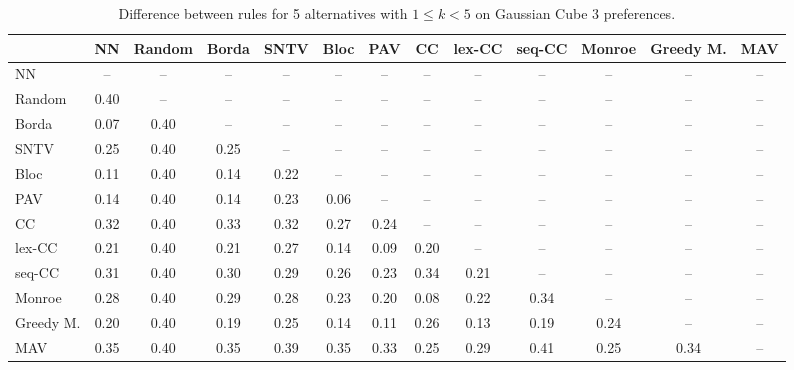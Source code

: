 
\begin{table*}[htbp]
\centering
\begin{tabular}{lcccccccccccc}
\toprule
 & NN & Random & Borda & SNTV & Bloc & PAV & CC & lex-CC & seq-CC & Monroe & Greedy M. & MAV \\
\midrule
NN & -- & -- & -- & -- & -- & -- & -- & -- & -- & -- & -- & -- \\
Random & \cellcolor{blue!40} 0.40 & -- & -- & -- & -- & -- & -- & -- & -- & -- & -- & -- \\
Borda & \cellcolor{blue!7} 0.07 & \cellcolor{blue!40} 0.40 & -- & -- & -- & -- & -- & -- & -- & -- & -- & -- \\
SNTV & \cellcolor{blue!25} 0.25 & \cellcolor{blue!40} 0.40 & \cellcolor{blue!25} 0.25 & -- & -- & -- & -- & -- & -- & -- & -- & -- \\
Bloc & \cellcolor{blue!11} 0.11 & \cellcolor{blue!40} 0.40 & \cellcolor{blue!14} 0.14 & \cellcolor{blue!22} 0.22 & -- & -- & -- & -- & -- & -- & -- & -- \\
PAV & \cellcolor{blue!14} 0.14 & \cellcolor{blue!40} 0.40 & \cellcolor{blue!14} 0.14 & \cellcolor{blue!23} 0.23 & \cellcolor{blue!6} 0.06 & -- & -- & -- & -- & -- & -- & -- \\
CC & \cellcolor{blue!32} 0.32 & \cellcolor{blue!40} 0.40 & \cellcolor{blue!33} 0.33 & \cellcolor{blue!32} 0.32 & \cellcolor{blue!27} 0.27 & \cellcolor{blue!24} 0.24 & -- & -- & -- & -- & -- & -- \\
lex-CC & \cellcolor{blue!21} 0.21 & \cellcolor{blue!40} 0.40 & \cellcolor{blue!21} 0.21 & \cellcolor{blue!27} 0.27 & \cellcolor{blue!14} 0.14 & \cellcolor{blue!9} 0.09 & \cellcolor{blue!20} 0.20 & -- & -- & -- & -- & -- \\
seq-CC & \cellcolor{blue!31} 0.31 & \cellcolor{blue!40} 0.40 & \cellcolor{blue!30} 0.30 & \cellcolor{blue!28} 0.29 & \cellcolor{blue!26} 0.26 & \cellcolor{blue!23} 0.23 & \cellcolor{blue!34} 0.34 & \cellcolor{blue!21} 0.21 & -- & -- & -- & -- \\
Monroe & \cellcolor{blue!28} 0.28 & \cellcolor{blue!40} 0.40 & \cellcolor{blue!28} 0.29 & \cellcolor{blue!28} 0.28 & \cellcolor{blue!23} 0.23 & \cellcolor{blue!20} 0.20 & \cellcolor{blue!8} 0.08 & \cellcolor{blue!22} 0.22 & \cellcolor{blue!34} 0.34 & -- & -- & -- \\
Greedy M. & \cellcolor{blue!20} 0.20 & \cellcolor{blue!40} 0.40 & \cellcolor{blue!19} 0.19 & \cellcolor{blue!25} 0.25 & \cellcolor{blue!14} 0.14 & \cellcolor{blue!11} 0.11 & \cellcolor{blue!26} 0.26 & \cellcolor{blue!13} 0.13 & \cellcolor{blue!19} 0.19 & \cellcolor{blue!24} 0.24 & -- & -- \\
MAV & \cellcolor{blue!35} 0.35 & \cellcolor{blue!40} 0.40 & \cellcolor{blue!35} 0.35 & \cellcolor{blue!39} 0.39 & \cellcolor{blue!35} 0.35 & \cellcolor{blue!33} 0.33 & \cellcolor{blue!25} 0.25 & \cellcolor{blue!28} 0.29 & \cellcolor{blue!41} 0.41 & \cellcolor{blue!25} 0.25 & \cellcolor{blue!34} 0.34 & -- \\
\bottomrule
\end{tabular}

\caption{Difference between rules for 5 alternatives with $1 \leq k < 5$ on Gaussian Cube 3 preferences.}
\label{tab:rule_distance_heatmap-m=[5]-pref_dist=euclidean__args__dimensions=3_-_space=gaussian_cube}
\end{table*}
    
